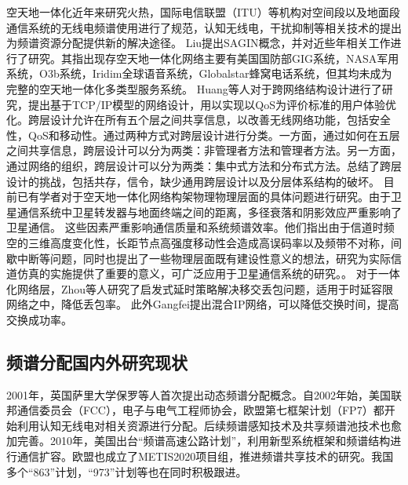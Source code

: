 空天地一体化近年来研究火热，国际电信联盟（ITU）等机构对空间段以及地面段通信系统的无线电频谱使用进行了规范，认知无线电，干扰抑制等相关技术的提出为频谱资源分配提供新的解决途径。
Liu提出SAGIN概念，并对近些年相关工作进行了研究\cite{8368236}。其指出现存空天地一体化网络主要有美国国防部GIG系统，NASA军用系统，O3b系统，Iridim全球语音系统，Globalstar蜂窝电话系统，但其均未成为完整的空天地一体化多类型服务系统。
Huang等人对于跨网络结构设计进行了研究，提出基于TCP/IP模型的网络设计，用以实现以QoS为评价标准的用户体验优化\cite{6587995}。跨层设计允许在所有五个层之间共享信息，以改善无线网络功能，包括安全性，QoS和移动性。通过两种方式对跨层设计进行分类。一方面，通过如何在五层之间共享信息，跨层设计可以分为两类：非管理者方法和管理者方法。另一方面，通过网络的组织，跨层设计可以分为两类：集中式方法和分布式方法。总结了跨层设计的挑战，包括共存，信令，缺少通用跨层设计以及分层体系结构的破坏。
目前已有学者对于空天地一体化网络构架物理物理层面的具体问题进行研究\cite{7879675}。由于卫星通信系统中卫星转发器与地面终端之间的距离，多径衰落和阴影效应严重影响了卫星通信。 这些因素严重影响通信质量和系统频谱效率。他们指出由于信道时频空的三维高度变化性，长距节点高强度移动性会造成高误码率以及频带不对称，间歇中断等问题，同时也提出了一些物理层面既有建设性意义的想法，研究为实际信道仿真的实施提供了重要的意义，可广泛应用于卫星通信系统的研究。。
对于一体化网络层，Zhou等人研究了启发式延时策略解决移交丢包问题，适用于时延容限网络之中，降低丢包率\cite{8116396}。
此外Gangfei提出混合IP网络，可以降低交换时间，提高交换成功率\cite{7925019}。


\subsection{频谱分配国内外研究现状}

2001年，英国萨里大学保罗等人首次提出动态频谱分配概念。自2002年始，美国联邦通信委员会（FCC），电子与电气工程师协会，欧盟第七框架计划（FP7）都开始利用认知无线电对相关资源进行分配。后续频谱感知技术及共享频谱池技术也愈加完善。2010年，美国出台“频谱高速公路计划”，利用新型系统框架和频谱结构进行通信扩容。欧盟也成立了METIS2020项目组，推进频谱共享技术的研究。我国多个“863”计划，“973”计划等也在同时积极跟进。


